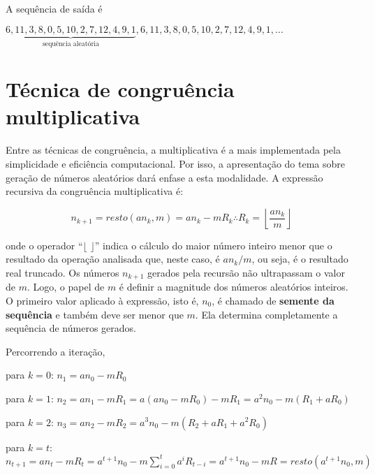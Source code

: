 \documentclass[a4paper,12pt,oneside,onecolumn]{uerj}
\begin{document}
\noindent A sequência de saída é

\begin{center}
$\underbrace{6, 11,  3,  8,  0,  5, 10,  2,  7, 12,  4,  9,  1}_{\text{sequência aleatória}},  6, 11,  3,  8,  0,  5, 10,  2,  7, 12,  4,  9,  1, ...$
\end{center}

\section{Técnica de congruência multiplicativa}

Entre as técnicas de congruência, a multiplicativa é a mais implementada pela simplicidade e eficiência computacional. Por isso, a apresentação do tema sobre geração de números aleatórios dará enfase a esta modalidade. A expressão recursiva da congruência multiplicativa é:

\begin{equation}
n_{k+1} = resto(an_{k},m) = an_{k} - mR_k \therefore R_k = \left\lfloor \frac{an_{k}}{m}\right\rfloor
\end{equation}

\noindent onde o operador ``$\lfloor$ $\rfloor$'' indica o cálculo do maior número inteiro menor que o resultado da operação analisada que, neste caso, é $an_{k}/m$, ou seja, é o resultado real truncado. Os números $n_{k+1}$ gerados pela recursão não ultrapassam o valor de $m$. Logo, o papel de $m$ é definir a magnitude dos números aleatórios inteiros. O primeiro valor aplicado à expressão, isto é, $n_0$, é chamado de \textbf{semente da sequência} e também deve ser menor que $m$. Ela determina completamente a sequência de números gerados.

Percorrendo a iteração, 

\begin{lcircp}
    \item para $k=0$: $n_1 = an_0 - mR_0$
    \item para $k=1$: $n_2 = an_1 - mR_1 = a(an_0 - mR_0) - mR_1 = a^2n_0 - m(R_1 + aR_0)$
    \item para $k=2$: $n_3 = an_2 - mR_2 = a^3n_0 - m(R_2 + aR_1 + a^2R_0)$
    \item para $k=t$: $n_{t+1} = an_t - mR_t = a^{t+1}n_0 - m\sum_{i=0}^{t} a^iR_{t-i} = a^{t+1}n_0 - mR = resto(a^{t+1}n_0,m)$\\
\end{lcircp}
\end{document}
